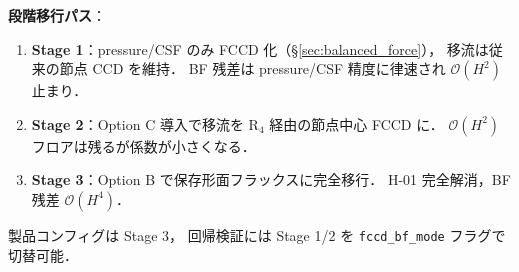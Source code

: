 \noindent\textbf{段階移行パス}：
\begin{enumerate}
  \item \textbf{Stage 1}：pressure/CSF のみ FCCD 化（\S\ref{sec:balanced_force}），
        移流は従来の節点 CCD を維持．
        BF 残差は pressure/CSF 精度に律速され $\mathcal{O}(H^2)$ 止まり．
  \item \textbf{Stage 2}：Option C 導入で移流を R$_4$ 経由の節点中心 FCCD に．
        $\mathcal{O}(H^2)$ フロアは残るが係数が小さくなる．
  \item \textbf{Stage 3}：Option B で保存形面フラックスに完全移行．
        H-01 完全解消，BF 残差 $\mathcal{O}(H^4)$．
\end{enumerate}
製品コンフィグは Stage 3，
回帰検証には Stage 1/2 を \texttt{fccd\_bf\_mode} フラグで切替可能．

